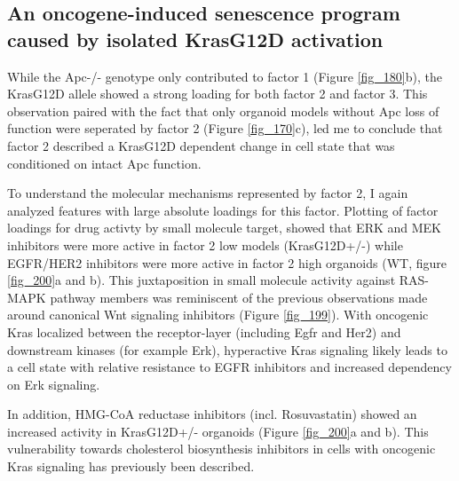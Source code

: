 \begin{flushleft}
\newpage

\section{An oncogene-induced senescence program caused by isolated KrasG12D activation}
While the Apc-/- genotype only contributed to factor 1 (Figure \ref{fig_180}b), the KrasG12D allele showed a strong loading for both factor 2 and factor 3. This observation paired with the fact that only organoid models without Apc loss of function were seperated by factor 2 (Figure \ref{fig_170}c), led me to conclude that factor 2 described a KrasG12D dependent change in cell state that was conditioned on intact Apc function.

\smallbreak

To understand the molecular mechanisms represented by factor 2, I again analyzed features with large absolute loadings for this factor. Plotting of factor loadings for drug activty by small molecule target, showed that ERK and MEK inhibitors were more active in factor 2 low models (KrasG12D+/-) while EGFR/HER2 inhibitors were more active in factor 2 high organoids (WT, figure \ref{fig_200}a and b). This juxtaposition in small molecule activity against RAS-MAPK pathway members was reminiscent of the previous observations made around canonical Wnt signaling inhibitors (Figure \ref{fig_199}). With oncogenic Kras localized between the receptor-layer (including Egfr and Her2) and downstream kinases (for example Erk), hyperactive Kras signaling likely leads to a cell state with relative resistance to EGFR inhibitors and increased dependency on Erk signaling. 

\smallbreak

In addition, HMG-CoA reductase inhibitors (incl. Rosuvastatin) showed an increased activity in KrasG12D+/- organoids (Figure \ref{fig_200}a and b). This vulnerability towards cholesterol biosynthesis inhibitors in cells with oncogenic Kras signaling has previously been described. 

\smallbreak


\end{flushleft}
